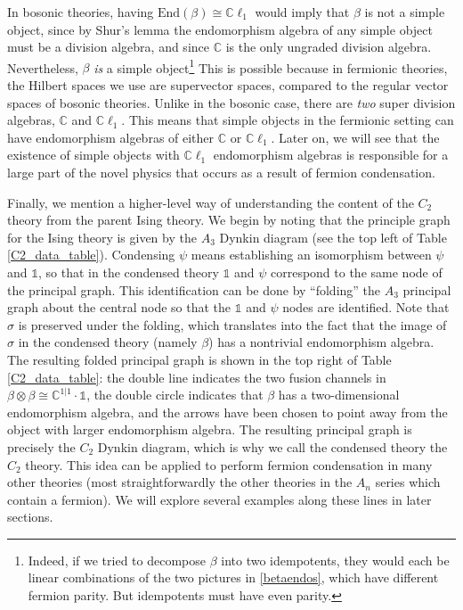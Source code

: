 \documentclass[12pt,a4paper]{article}
\newcounter{arrow}
\newcommand{\tp}{\otimes}
\newcommand{\unit}{\mathds{1}}
\newcommand{\cc}{\mathbb{C}}
\newcommand{\End}{\text{End}}
\newcommand{\cl}{\mathbb{C}\ell}
\begin{document}
In bosonic theories, having $\End(\beta)\cong\cl_1$ would imply that $\beta$ is not a simple object, 
since by Shur's lemma the endomorphism algebra of any simple object must be a division algebra, and
since $\cc$ is the only ungraded division algebra.
Nevertheless, $\beta$ {\it is} a simple object\footnote{Indeed, if we tried to decompose $\beta$ 
into two idempotents, they would each be linear combinations of the two pictures in \eqref{betaendos}, 
which have different fermion parity.
But idempotents must have even parity.}
This is possible because in fermionic theories, the Hilbert spaces we use are supervector spaces, 
compared to the regular vector spaces of bosonic theories. 
Unlike in the bosonic case, there are {\it two} super division algebras, $\cc$ and $\cl_1$.
This means that simple objects in the fermionic setting can have endomorphism algebras of either $\cc$ or $\cl_1$.  
Later on, we will see that the existence of simple objects with $\cl_1$ endomorphism 
algebras is responsible for a large part of the novel physics that occurs as a result of fermion condensation. 

Finally, we mention a higher-level way of understanding the content of the $C_2$ theory from the
parent Ising theory. We begin by noting that the principle graph for the Ising theory 
is given by the $A_3$ Dynkin diagram (see the top left of Table \ref{C2_data_table}). 
Condensing $\psi$ means establishing an isomorphism between $\psi$ and $\unit$, 
so that in the condensed theory $\unit$ and $\psi$ correspond to the same node of the 
principal graph. This identification can be done by ``folding'' the $A_3$ principal graph 
about the central node so that the $\unit$ and $\psi$ nodes are identified. 
Note that $\sigma$ is preserved under the folding, which translates into the fact that the 
image of $\sigma$ in the condensed theory (namely $\beta$) has a nontrivial endomorphism 
algebra. 
The resulting folded principal graph is shown in the top right of Table \ref{C2_data_table}: the double 
line indicates the two fusion channels in $\beta\tp\beta \cong\cc^{1|1}\cdot \unit$, the 
double circle indicates that $\beta$ has a two-dimensional endomorphism algebra, and 
the arrows have been chosen to point away from the object with larger endomorphism 
algebra. The resulting principal graph is precisely the $C_2$ Dynkin diagram, 
which is why we call the condensed theory the $C_2$ theory. 
This idea can be applied to perform fermion condensation in many other theories (most straightforwardly 
the other theories in the $A_n$ series which contain a fermion). 
We will explore several examples along these lines in later sections. 
\end{document}
